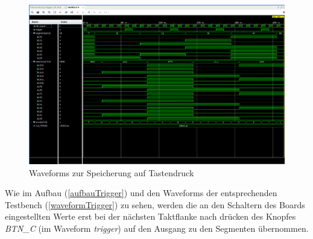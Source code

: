 \documentclass[11pt, a4paper]{article}
\begin{document}
\begin{figure}[htb]    
    \centering
    \includegraphics[width=\linewidth]{versuch4Data/hierarchical_trigger.png}
    \caption{Waveforms zur Speicherung auf Tastendruck}
    \label{waveformTrigger}        
\end{figure}
Wie im Aufbau (\autoref{aufbauTrigger}) und den Waveforms der entsprechenden Testbench (\autoref{waveformTrigger}) zu sehen, werden die an den Schaltern des Boards eingestellten Werte erst bei der nächsten Taktflanke nach drücken des Knopfes \textit{BTN\_C} (im Waveform \textit{trigger}) auf den Ausgang zu den Segmenten übernommen.
\end{document}
